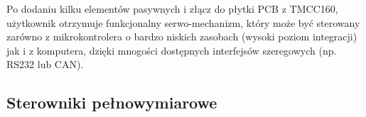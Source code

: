 Po dodaniu kilku elementów pasywnych i złącz do płytki PCB z TMCC160, użytkownik otrzymuje funkcjonalny serwo-mechanizm, który może być sterowany zarówno z mikrokontrolera o bardzo niskich zasobach (wysoki poziom integracji) jak i z komputera, dzięki mnogości dostępnych interfejsów szeregowych (np. RS232 lub CAN).

\subsection{Sterowniki pełnowymiarowe}






\clearpage



